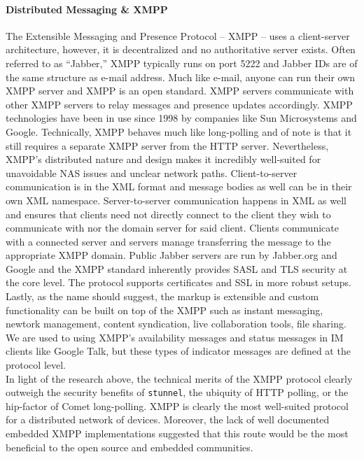 \paragraph{Distributed Messaging \& XMPP} The Extensible Messaging and Presence Protocol -- XMPP -- uses a client-server architecture, however, it is decentralized and no authoritative server exists.  Often referred to as ``Jabber,'' XMPP typically runs on port 5222 and Jabber IDs are of the same structure as e-mail address.  Much like e-mail, anyone can run their own XMPP server and XMPP is an open standard.  XMPP servers communicate with other XMPP servers to relay messages and presence updates accordingly.  XMPP technologies have been in use since 1998 by companies like Sun Microsystems and Google.    Technically, XMPP behaves much like long-polling and of note is that it still requires a separate XMPP server from the HTTP server. Nevertheless, XMPP's distributed nature and design makes it incredibly well-suited for unavoidable NAS issues and unclear network paths.  Client-to-server communication is in the XML format and message bodies as well can be in their own XML namespace.  Server-to-server communication happens in XML as well and ensures that clients need not directly connect to the client they wish to communicate with nor the domain server for said client.  Clients communicate with a connected server and servers manage transferring the message to the appropriate XMPP domain.  Public Jabber servers are run by Jabber.org and Google and the XMPP standard inherently provides SASL and TLS security at the core level.  The protocol supports certificates and SSL in more robust setups.  Lastly, as the name should suggest, the markup is extensible and custom functionality can be built on top of the XMPP such as instant messaging, newtork management, content syndication, live collaboration tools, file sharing. We are used to using XMPP's availability messages and status messages in IM clients like Google Talk, but these types of indicator messages are defined at the protocol level.
\newline
\\
In light of the research above, the technical merits of the XMPP protocol clearly outweigh the security benefits of \texttt{stunnel}, the ubiquity of HTTP polling, or the hip-factor of Comet long-polling. XMPP is clearly the most well-suited protocol for a distributed network of devices.  Moreover, the lack of well documented embedded XMPP implementations suggested that this route would be the most beneficial to the open source and embedded communities.\\

